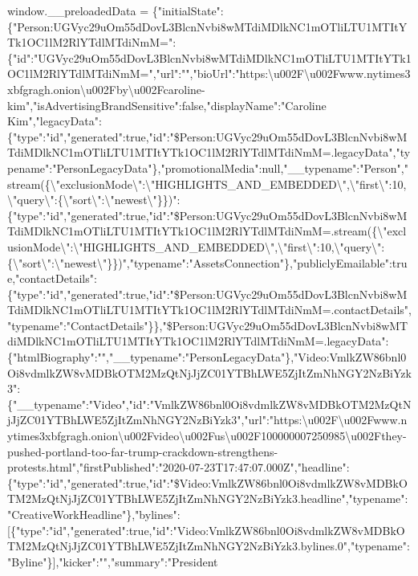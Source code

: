 window.\_\_preloadedData =
\{"initialState":\{"Person:UGVyc29uOm55dDovL3BlcnNvbi8wMTdiMDlkNC1mOTliLTU1MTItYTk1OC1lM2RlYTdlMTdiNmM=":\{"id":"UGVyc29uOm55dDovL3BlcnNvbi8wMTdiMDlkNC1mOTliLTU1MTItYTk1OC1lM2RlYTdlMTdiNmM=","url":"","bioUrl":"https:\textbackslash{}u002F\textbackslash{}u002Fwww.nytimes3xbfgragh.onion\textbackslash{}u002Fby\textbackslash{}u002Fcaroline-kim","isAdvertisingBrandSensitive":false,"displayName":"Caroline
Kim","legacyData":\{"type":"id","generated":true,"id":"\$Person:UGVyc29uOm55dDovL3BlcnNvbi8wMTdiMDlkNC1mOTliLTU1MTItYTk1OC1lM2RlYTdlMTdiNmM=.legacyData","typename":"PersonLegacyData"\},"promotionalMedia":null,"\_\_typename":"Person","stream(\{\textbackslash{}"exclusionMode\textbackslash{}":\textbackslash{}"HIGHLIGHTS\_AND\_EMBEDDED\textbackslash{}",\textbackslash{}"first\textbackslash{}":10,\textbackslash{}"query\textbackslash{}":\{\textbackslash{}"sort\textbackslash{}":\textbackslash{}"newest\textbackslash{}"\}\})":\{"type":"id","generated":true,"id":"\$Person:UGVyc29uOm55dDovL3BlcnNvbi8wMTdiMDlkNC1mOTliLTU1MTItYTk1OC1lM2RlYTdlMTdiNmM=.stream(\{\textbackslash{}"exclusionMode\textbackslash{}":\textbackslash{}"HIGHLIGHTS\_AND\_EMBEDDED\textbackslash{}",\textbackslash{}"first\textbackslash{}":10,\textbackslash{}"query\textbackslash{}":\{\textbackslash{}"sort\textbackslash{}":\textbackslash{}"newest\textbackslash{}"\}\})","typename":"AssetsConnection"\},"publiclyEmailable":true,"contactDetails":\{"type":"id","generated":true,"id":"\$Person:UGVyc29uOm55dDovL3BlcnNvbi8wMTdiMDlkNC1mOTliLTU1MTItYTk1OC1lM2RlYTdlMTdiNmM=.contactDetails","typename":"ContactDetails"\}\},"\$Person:UGVyc29uOm55dDovL3BlcnNvbi8wMTdiMDlkNC1mOTliLTU1MTItYTk1OC1lM2RlYTdlMTdiNmM=.legacyData":\{"htmlBiography":"","\_\_typename":"PersonLegacyData"\},"Video:VmlkZW86bnl0Oi8vdmlkZW8vMDBkOTM2MzQtNjJjZC01YTBhLWE5ZjItZmNhNGY2NzBiYzk3":\{"\_\_typename":"Video","id":"VmlkZW86bnl0Oi8vdmlkZW8vMDBkOTM2MzQtNjJjZC01YTBhLWE5ZjItZmNhNGY2NzBiYzk3","url":"https:\textbackslash{}u002F\textbackslash{}u002Fwww.nytimes3xbfgragh.onion\textbackslash{}u002Fvideo\textbackslash{}u002Fus\textbackslash{}u002F100000007250985\textbackslash{}u002Fthey-pushed-portland-too-far-trump-crackdown-strengthens-protests.html","firstPublished":"2020-07-23T17:47:07.000Z","headline":\{"type":"id","generated":true,"id":"\$Video:VmlkZW86bnl0Oi8vdmlkZW8vMDBkOTM2MzQtNjJjZC01YTBhLWE5ZjItZmNhNGY2NzBiYzk3.headline","typename":"CreativeWorkHeadline"\},"bylines":{[}\{"type":"id","generated":true,"id":"Video:VmlkZW86bnl0Oi8vdmlkZW8vMDBkOTM2MzQtNjJjZC01YTBhLWE5ZjItZmNhNGY2NzBiYzk3.bylines.0","typename":"Byline"\}{]},"kicker":"","summary":"President
